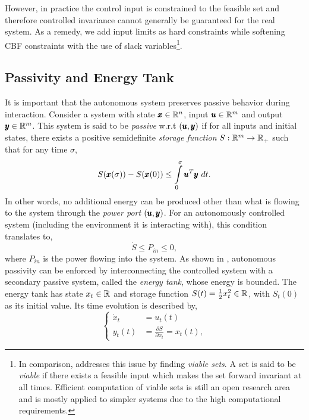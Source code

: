 However, in practice the control input is constrained to the feasible set and therefore controlled invariance cannot generally be guaranteed for the real system. As a remedy, we add input limits as hard constraints while softening CBF constraints with the use of slack variables\footnote{In comparison, \cite{gurriet2018towards} addresses this issue by finding \emph{viable sets}. A set is said to be \emph{viable} if there exists a feasible input which makes the set forward invariant at all times. Efficient computation of viable sets is still an open research area and is mostly applied to simpler systems due to the high computational requirements.}.

\subsection{Passivity and Energy Tank}
It is important that the autonomous system preserves passive behavior during interaction. Consider a system with state $\pmb{x} \in \mathbb{R}^{n}$, input $\pmb{u} \in \mathbb{R}^{m}$ and output $\pmb{y} \in \mathbb{R}^{m}$. 
This system is said to be \emph{passive} w.r.t $(\pmb{u},\pmb{y})$ if for all inputs and initial states, there exists a positive semidefinite \emph{storage function} $S: \mathbb{R}^{m} \rightarrow \mathbb{R}^{}_+$ such that for any time $\sigma$,
\begin{equation}
    S(\pmb{x}(\sigma)) - S(\pmb{x}(0))\leq \int\limits_{0}^{\sigma} \pmb{u}^T \pmb{y}\ dt.  
\end{equation}
In other words, no additional energy can be produced other than what is flowing to the system through the \textit{power port} $(\pmb{u},\pmb{y})$.
For an autonomously controlled system (including the environment it is interacting with), this condition translates to, 
\begin{equation}
    \dot{S} \leq P_{in} \leq 0,
\end{equation}
where $P_{in}$ is the power flowing into the system. As shown in \cite{shahriari2018valve}, autonomous passivity can be enforced by interconnecting the controlled system with a secondary passive system, called the \emph{energy tank}, whose energy is bounded. The energy tank has state $x_t \in \mathbb{R}^{}$ and storage function $S(t) = \frac{1}{2} x_t^2 \in \mathbb{R}^{}$, with $S_t(0)$ as its initial value. Its time evolution is described by,
\begin{equation}
\begin{cases}
\dot{x}_t &= u_t(t) \\
y_t(t) &= \frac{\partial S}{\partial x_t} = x_t(t),
\end{cases}
\end{equation}
